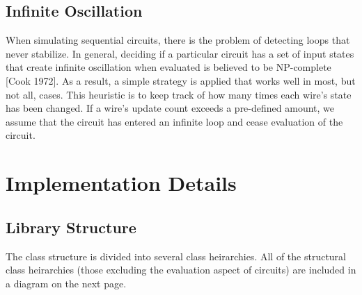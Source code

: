 \documentclass{article}
\begin{document}
\subsection{Infinite Oscillation}

When simulating sequential circuits, there is the problem of detecting loops that never stabilize. In general, deciding if a particular circuit has a set of input states that create  infinite oscillation when evaluated is believed to be NP-complete [Cook 1972]. As a result, a simple strategy is applied that works well in most, but not all, cases. This heuristic is to keep track of how many times each wire’s state has been changed. If a wire's update count exceeds a pre-defined amount, we assume that the circuit has entered an infinite loop and cease evaluation of the circuit.

\section{Implementation Details}

\subsection{Library Structure}

The class structure is divided into several class heirarchies. All of the structural class heirarchies (those excluding the evaluation aspect of circuits) are included in a diagram on the next page.
\end{document}
